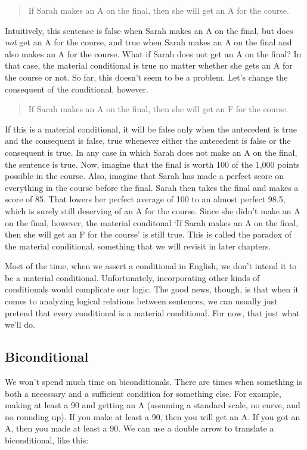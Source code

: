 \documentclass[../logic-text.tex]{subfiles}
\begin{document}
\begin{quote}
  If Sarah makes an A on the final, then she will get an A for the course.
\end{quote}

\noindent Intuitively, this sentence is false when Sarah makes an A on the final, but does \emph{not} get an A for the course, and true when Sarah makes an A on the final and also makes an A for the course. What if Sarah does not get an A on the final? In that case, the material conditional is true no matter whether she gets an A for the course or not. So far, this doesn't seem to be a problem. Let's change the consequent of the conditional, however.


\begin{quote}
  If Sarah makes an A on the final, then she will get an F for the course.
\end{quote}

If this is a material conditional, it will be false only when the antecedent is true and the consequent is false, true whenever either the antecedent is false or the consequent is true. In any case in which Sarah does not make an A on the final, the sentence is true. Now, imagine that the final is worth 100 of the 1,000 points possible in the course. Also, imagine that Sarah has made a perfect score on everything in the course before the final. Sarah then takes the final and makes a score of 85. That lowers her perfect average of 100 to an almost perfect 98.5, which is surely still deserving of an A for the course. Since she didn't make an A on the final, however, the material conditonal \enquote*{If Sarah makes an A on the final, then she will get an F for the course} is still true. This is called the paradox of the material conditional, something that we will revisit in later chapters.

Most of the time, when we assert a conditional in English, we don't intend it to be a material conditional. Unfortunately, incorporating other kinds of conditionals would complicate our logic. The good news, though, is that when it comes to analyzing logical relations between sentences, we can usually just pretend that every conditional is a material conditional. For now, that just what we'll do.


\subsection{Biconditional}\label{biconditional}

We won't spend much time on biconditionals. There are times when something is both a necessary and a sufficient condition for something else. For example, making at least a 90 and getting an A (assuming a standard scale, no curve, and no rounding up). If you make at least a 90, then you will get an A. If you got an A, then you made at least a 90. We can use a double arrow to translate a biconditional, like this:
\end{document}
